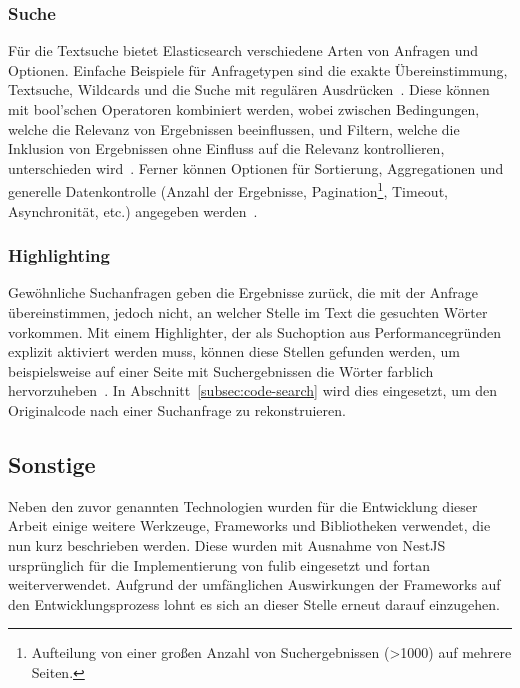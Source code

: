 \subsubsection{Suche}
Für die Textsuche bietet Elasticsearch verschiedene Arten von Anfragen und Optionen.
Einfache Beispiele für Anfragetypen sind die exakte Übereinstimmung, Textsuche, Wildcards und die Suche mit regulären Ausdrücken~\cite{elastic-query-dsl}.
Diese können mit bool'schen Operatoren kombiniert werden, wobei zwischen Bedingungen, welche die Relevanz von Ergebnissen beeinflussen, und Filtern, welche die Inklusion von Ergebnissen ohne Einfluss auf die Relevanz kontrollieren, unterschieden wird~\cite{elastic-bool-query}.
Ferner können Optionen für Sortierung, Aggregationen und generelle Datenkontrolle (Anzahl der Ergebnisse, Pagination\footnote{Aufteilung von einer großen Anzahl von Suchergebnissen (>1000) auf mehrere Seiten.}, Timeout, Asynchronität, etc.) angegeben werden~\cite{elastic-search-data}.

\subsubsection{Highlighting}
Gewöhnliche Suchanfragen geben die Ergebnisse zurück, die mit der Anfrage übereinstimmen, jedoch nicht, an welcher Stelle im Text die gesuchten Wörter vorkommen.
Mit einem Highlighter, der als Suchoption aus Performancegründen explizit aktiviert werden muss, können diese Stellen gefunden werden, um beispielsweise auf einer Seite mit Suchergebnissen die Wörter farblich hervorzuheben~\cite{elastic-highlighting}.
In Abschnitt~\ref{subsec:code-search} wird dies eingesetzt, um den Originalcode nach einer Suchanfrage zu rekonstruieren.

\subsection{Sonstige}\label{subsec:other-libraries}

Neben den zuvor genannten Technologien wurden für die Entwicklung dieser Arbeit einige weitere Werkzeuge, Frameworks und Bibliotheken verwendet, die nun kurz beschrieben werden.
Diese wurden mit Ausnahme von NestJS ursprünglich für die Implementierung von fulib eingesetzt und fortan weiterverwendet.
Aufgrund der umfänglichen Auswirkungen der Frameworks auf den Entwicklungsprozess lohnt es sich an dieser Stelle erneut darauf einzugehen.

